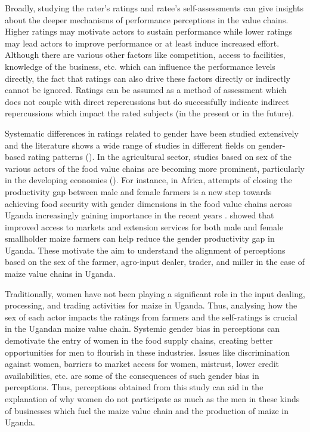\documentclass[12pt,english]{article}\usepackage[]{graphicx}\usepackage[]{color}
\begin{document}
\begin{onehalfspace}
Broadly, studying the rater's ratings and ratee's self-assessments
can give insights about the deeper mechanisms of performance perceptions
in the value chains. Higher ratings may motivate actors to sustain
performance while lower ratings may lead actors to improve performance
or at least induce increased effort. Although there are various other
factors like competition, access to facilities, knowledge of the business,
etc. which can influence the performance levels directly, the fact
that ratings can also drive these factors directly or indirectly cannot
be ignored. Ratings can be assumed as a method of assessment which
does not couple with direct repercussions but do successfully indicate
indirect repercussions which impact the rated subjects (in the present
or in the future).

Systematic differences in ratings related to gender have been studied
extensively and the literature shows a wide range of studies in different
fields on gender-based rating patterns (\citealp{Mitchell2018,Furnham2005,Patiar2008}).
In the agricultural sector, studies based on sex of the various actors
of the food value chains are becoming more prominent, particularly
in the developing economies (\citealp{doi:10.1080/00220388.2012.663902,barrientos2019,Kruijssen2018,Mnimbo2017}).
For instance, in Africa, attempts of closing the productivity gap
between male and female farmers is a new step towards achieving food
security with gender dimensions in the food value chains across Uganda
increasingly gaining importance in the recent years \citep{akite2018,bamanyaki2020,nchanji2020}.
\citet{Larson2016} showed that improved access to markets and extension
services for both male and female smallholder maize farmers can help
reduce the gender productivity gap in Uganda. These motivate the aim
to understand the alignment of perceptions based on the sex of the
farmer, agro-input dealer, trader, and miller in the case of maize
value chains in Uganda.

Traditionally, women have not been playing a significant role in the
input dealing, processing, and trading activities for maize in Uganda.
Thus, analysing how the sex of each actor impacts the ratings from
farmers and the self-ratings is crucial in the Ugandan maize value
chain. Systemic gender bias in perceptions can demotivate the entry
of women in the food supply chains, creating better opportunities
for men to flourish in these industries. Issues like discrimination
against women, barriers to market access for women, mistrust, lower
credit availabilities, etc. are some of the consequences of such gender
bias in perceptions. Thus, perceptions obtained from this study can
aid in the explanation of why women do not participate as much as
the men in these kinds of businesses which fuel the maize value chain
and the production of maize in Uganda. 


\end{onehalfspace}
\end{document}
